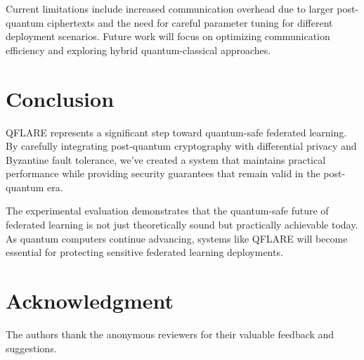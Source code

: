 \documentclass[journal,onecolumn]{IEEEtran}
\begin{document}
Current limitations include increased communication overhead due to larger post-quantum ciphertexts and the need for careful parameter tuning for different deployment scenarios. Future work will focus on optimizing communication efficiency and exploring hybrid quantum-classical approaches.

\section{Conclusion}

QFLARE represents a significant step toward quantum-safe federated learning. By carefully integrating post-quantum cryptography with differential privacy and Byzantine fault tolerance, we've created a system that maintains practical performance while providing security guarantees that remain valid in the post-quantum era.

The experimental evaluation demonstrates that the quantum-safe future of federated learning is not just theoretically sound but practically achievable today. As quantum computers continue advancing, systems like QFLARE will become essential for protecting sensitive federated learning deployments.

\section*{Acknowledgment}

The authors thank the anonymous reviewers for their valuable feedback and suggestions.
\end{document}
